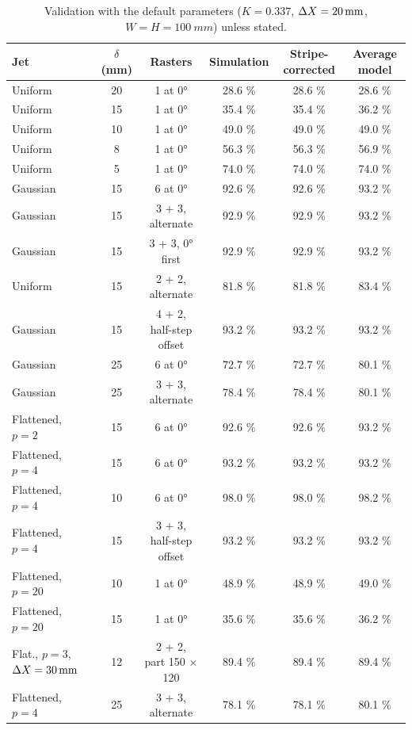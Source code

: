 \documentclass[11pt,a4paper]{article}
\begin{document}
\begin{table}[H]
\centering\small
\caption{Validation with the default parameters ($K=0.337$, $\Delta X=\SI{20}{mm}$, $W=H=\SI{100}{mm}$) unless stated.}
\label{tab:valid}
\setlength{\tabcolsep}{4pt}
\begin{tabular}{@{}lccccc@{}}
\toprule
Jet & $\delta$ (mm) & Rasters & Simulation & Stripe-corrected & Average model\\
\midrule
Uniform & 20 & 1 at 0° & 28.6 \% & 28.6 \% & 28.6 \%\\
Uniform & 15 & 1 at 0° & 35.4 \% & 35.4 \% & 36.2 \%\\
Uniform & 10 & 1 at 0° & 49.0 \% & 49.0 \% & 49.0 \%\\
Uniform & 8 & 1 at 0° & 56.3 \% & 56.3 \% & 56.9 \%\\
Uniform & 5 & 1 at 0° & 74.0 \% & 74.0 \% & 74.0 \%\\
Gaussian & 15 & 6 at 0° & 92.6 \% & 92.6 \% & 93.2 \%\\
Gaussian & 15 & 3 + 3, alternate & 92.9 \% & 92.9 \% & 93.2 \%\\
Gaussian & 15 & 3 + 3, 0° first & 92.9 \% & 92.9 \% & 93.2 \%\\
Uniform & 15 & 2 + 2, alternate & 81.8 \% & 81.8 \% & 83.4 \%\\
Gaussian & 15 & 4 + 2, half-step offset & 93.2 \% & 93.2 \% & 93.2 \%\\
\midrule
Gaussian & 25 & 6 at 0° & 72.7 \% & 72.7 \% & 80.1 \%\\
Gaussian & 25 & 3 + 3, alternate & 78.4 \% & 78.4 \% & 80.1 \%\\
\midrule
Flattened, $p=2$ & 15 & 6 at 0° & 92.6 \% & 92.6 \% & 93.2 \%\\
Flattened, $p=4$ & 15 & 6 at 0° & 93.2 \% & 93.2 \% & 93.2 \%\\
Flattened, $p=4$ & 10 & 6 at 0° & 98.0 \% & 98.0 \% & 98.2 \%\\
Flattened, $p=4$ & 15 & 3 + 3, half-step offset & 93.2 \% & 93.2 \% & 93.2 \%\\
Flattened, $p=20$ & 10 & 1 at 0° & 48.9 \% & 48.9 \% & 49.0 \%\\
Flattened, $p=20$ & 15 & 1 at 0° & 35.6 \% & 35.6 \% & 36.2 \%\\
Flat., $p=3$, $\Delta X=\SI{30}{mm}$ & 12 & 2 + 2, part 150 × 120 & 89.4 \% & 89.4 \% & 89.4 \%\\
Flattened, $p=4$ & 25 & 3 + 3, alternate & 78.1 \% & 78.1 \% & 80.1 \%\\
\bottomrule
\end{tabular}
\end{table}
\end{document}
